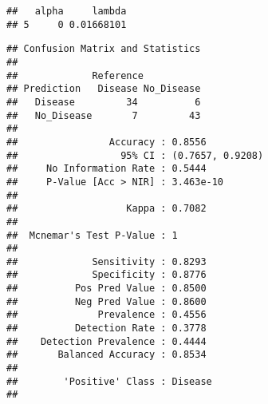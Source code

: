 \documentclass[
]{article}
\newenvironment{Shaded}{\begin{snugshade}}{\end{snugshade}}
\newcommand{\AttributeTok}[1]{\textcolor[rgb]{0.13,0.29,0.53}{#1}}
\newcommand{\CommentTok}[1]{\textcolor[rgb]{0.56,0.35,0.01}{\textit{#1}}}
\newcommand{\DecValTok}[1]{\textcolor[rgb]{0.00,0.00,0.81}{#1}}
\newcommand{\FunctionTok}[1]{\textcolor[rgb]{0.13,0.29,0.53}{\textbf{#1}}}
\newcommand{\NormalTok}[1]{#1}
\newcommand{\OtherTok}[1]{\textcolor[rgb]{0.56,0.35,0.01}{#1}}
\newcommand{\SpecialCharTok}[1]{\textcolor[rgb]{0.81,0.36,0.00}{\textbf{#1}}}
\newcommand{\StringTok}[1]{\textcolor[rgb]{0.31,0.60,0.02}{#1}}
\begin{document}
\begin{Shaded}
\end{Shaded}

\begin{verbatim}
##   alpha     lambda
## 5     0 0.01668101
\end{verbatim}

\begin{Shaded}
\end{Shaded}

\begin{verbatim}
## Confusion Matrix and Statistics
## 
##             Reference
## Prediction   Disease No_Disease
##   Disease         34          6
##   No_Disease       7         43
##                                           
##                Accuracy : 0.8556          
##                  95% CI : (0.7657, 0.9208)
##     No Information Rate : 0.5444          
##     P-Value [Acc > NIR] : 3.463e-10       
##                                           
##                   Kappa : 0.7082          
##                                           
##  Mcnemar's Test P-Value : 1               
##                                           
##             Sensitivity : 0.8293          
##             Specificity : 0.8776          
##          Pos Pred Value : 0.8500          
##          Neg Pred Value : 0.8600          
##              Prevalence : 0.4556          
##          Detection Rate : 0.3778          
##    Detection Prevalence : 0.4444          
##       Balanced Accuracy : 0.8534          
##                                           
##        'Positive' Class : Disease         
## 
\end{verbatim}
\end{document}
